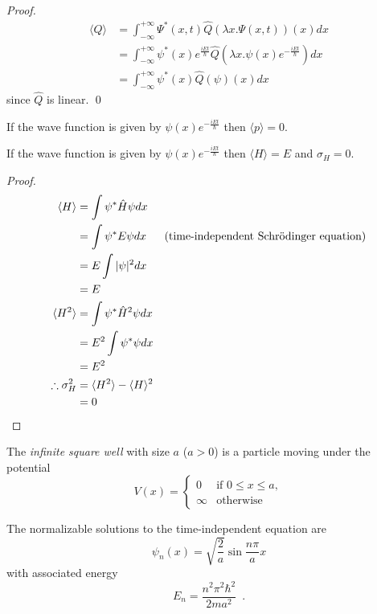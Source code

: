 \begin{proof}
\pf
\begin{align*}
\langle Q \rangle & = \int_{- \infty}^{+ \infty} \Psi^*(x,t) \hat{Q}(\lambda x.\Psi(x,t))(x) dx \\
& = \int_{-\infty}^{+ \infty} \psi^*(x) e^{\frac{iEt}{\hbar}} \hat{Q}(\lambda x. \psi(x) e^{- \frac{iEt}{\hbar}}) dx \\
& = \int_{-\infty}^{+\infty} \psi^*(x) \hat{Q}(\psi)(x) dx
\end{align*}
since $\hat{Q}$ is linear. \qed
\end{proof}

\begin{cor}
If the wave function is given by $\psi(x) e^{- \frac{iEt}{\hbar}}$ then $\langle p \rangle = 0$.
\end{cor}

\begin{prop}
If the wave function is given by $\psi(x) e^{- \frac{iEt}{\hbar}}$ then $\langle H \rangle = E$ and $\sigma_H = 0$.
\end{prop}

\begin{proof}
\pf
\begin{align*}
\langle H \rangle & = \int \psi^* \hat{H} \psi dx \\
& = \int \psi^* E \psi dx & (\text{time-independent Schr\"{o}dinger equation}) \\
& = E \int |\psi|^2 dx \\
& = E \\
\langle H^2 \rangle & = \int \psi^* \hat{H}^2 \psi dx \\
& = E^2 \int \psi^* \psi dx \\
& = E^2 \\
\therefore \sigma_H^2 & = \langle H^2 \rangle - \langle H \rangle^2 \\
& = 0 & \qed
\end{align*}
\end{proof}

\begin{ex}

The \emph{infinite square well} with size $a$ ($a > 0$) is a particle moving under the potential
\[ V(x) = \begin{cases}
0 & \text{if } 0 \leq x \leq a , \\
\infty & \text{otherwise}
\end{cases} \]

The normalizable solutions to the time-independent equation are
\[ \psi_n(x) = \sqrt{\frac{2}{a}} \sin \frac{n \pi}{a} x \]
with associated energy
\[ E_n = \frac{n^2 \pi^2 \hbar^2}{2 m a^2} \enspace . \]
\end{ex}

